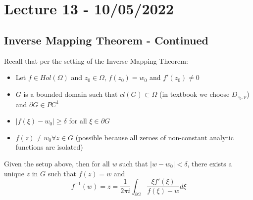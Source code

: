 \section{Lecture 13 - 10/05/2022}

\subsection{Inverse Mapping Theorem - Continued}

Recall that per the setting of the Inverse Mapping Theorem:
\begin{itemize}
    \item Let $f \in Hol(\Omega)$ and $z_0 \in \Omega$, $f(z_0) = w_0$ and $f'(z_0) \neq 0$
    \item $G$ is a bounded domain such that $cl(G) \subset \Omega$ (in textbook we choose $D_{z_0, p}$) and $\partial G \in PC^1$
    \item $|f(\xi) - w_0| \geq \delta$ for all $\xi \in \partial G$
    \item $f(z) \neq w_0 \forall z \in G$ (possible because all zeroes of non-constant analytic functions are isolated)
\end{itemize}

\begin{theorem}
Given the setup above, then for all $w$ such that $|w - w_0| < \delta$, there exists a unique $z$ in $G$ such that $f(z) = w$ and
\[f^{-1}(w) = z = \frac{1}{2\pi i} \int_{\partial G} \frac{\xi f'(\xi)}{f(\xi) - w} d\xi\]
\end{theorem}


